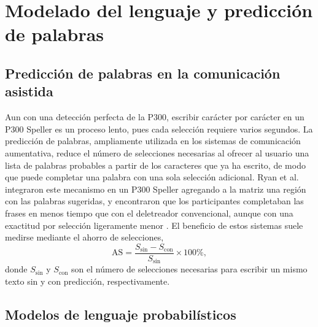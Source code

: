 \section[MODELADO DEL LENGUAJE Y PREDICCIÓN DE PALABRAS]{Modelado del lenguaje y predicción de
palabras}
\label{sec:lenguaje}

\subsection{Predicción de palabras en la comunicación asistida}

Aun con una detección perfecta de la P300, escribir carácter por carácter en un P300 Speller es un
proceso lento, pues cada selección requiere varios segundos. La predicción de palabras, ampliamente
utilizada en los sistemas de comunicación aumentativa, reduce el número de selecciones necesarias
al ofrecer al usuario una lista de palabras probables a partir de los caracteres que ya ha escrito,
de modo que puede completar una palabra con una sola selección adicional. Ryan et al. integraron
este mecanismo en un P300 Speller agregando a la matriz una región con las palabras sugeridas, y
encontraron que los participantes completaban las frases en menos tiempo que con el deletreador
convencional, aunque con una exactitud por selección ligeramente menor \cite{ryan2011}. El
beneficio de estos sistemas suele medirse mediante el ahorro de selecciones,
\begin{equation}
\text{AS} = \frac{S_{\text{sin}} - S_{\text{con}}}{S_{\text{sin}}}\times100\%,
\label{eq:ahorro}
\end{equation}
donde $S_{\text{sin}}$ y $S_{\text{con}}$ son el número de selecciones necesarias para escribir un
mismo texto sin y con predicción, respectivamente.

\subsection{Modelos de lenguaje probabilísticos}

